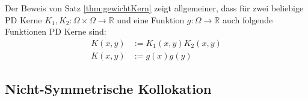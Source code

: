 \begin{remark}
Der Beweis von Satz \ref{thm:gewichtKern} zeigt allgemeiner, dass für zwei beliebige \ac{PD} Kerne $K_1, K_2: \Omega \times \Omega \rightarrow \mathbb{R}$ und eine Funktion $g: \Omega \rightarrow \mathbb{R}$ auch folgende Funktionen \ac{PD} Kerne sind:
\begin{align*}
K(x,y) &:= K_1(x,y)K_2(x,y)\\
K(x,y) &:= g(x)g(y)
\end{align*}
\end{remark}
\subsection{Nicht-Symmetrische Kollokation}